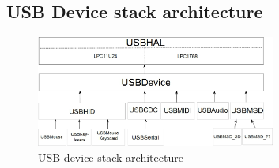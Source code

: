 \documentclass[pdftex,10pt,a4paper]{report}
\begin{document}
\subsection{USB Device stack architecture}
\begin{figure}[h!]
		\centering
		\includegraphics[width=0.7\textwidth]{./usb_arch3.jpg}
		\caption{USB device stack architecture}
		\label{USB device stack architecture}
\end{figure}
\end{document}
